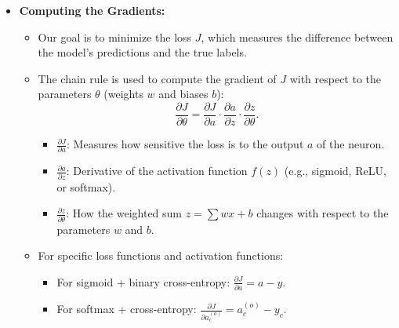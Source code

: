 \documentclass{article}
\begin{document}
\begin{enumerate}
\begin{itemize}
        \pagebreak
        
        \item \textbf{Computing the Gradients:}
    \begin{itemize}
        \item Our goal is to minimize the loss \(J\), which measures the difference between the model's predictions and the true labels.
        \item The chain rule is used to compute the gradient of \(J\) with respect to the parameters \(\theta\) (weights \(w\) and biases \(b\)):
        \[
        \frac{\partial J}{\partial \theta} = \frac{\partial J}{\partial a} \cdot \frac{\partial a}{\partial z} \cdot \frac{\partial z}{\partial \theta}.
        \]
        \begin{itemize}
            \item \(\frac{\partial J}{\partial a}\): Measures how sensitive the loss is to the output \(a\) of the neuron.
            \item \(\frac{\partial a}{\partial z}\): Derivative of the activation function \(f(z)\) (e.g., sigmoid, ReLU, or softmax).
            \item \(\frac{\partial z}{\partial \theta}\): How the weighted sum \(z = \sum w x + b\) changes with respect to the parameters \(w\) and \(b\).
        \end{itemize}
        \item For specific loss functions and activation functions:
        \begin{itemize}
            \item For sigmoid + binary cross-entropy: \(\frac{\partial J}{\partial a} = a - y\).
            \item For softmax + cross-entropy: \(\frac{\partial J}{\partial a_c^{(o)}} = a_c^{(o)} - y_c\).
        \end{itemize}
    \end{itemize}
        

\end{itemize}
\end{enumerate}
\end{document}
